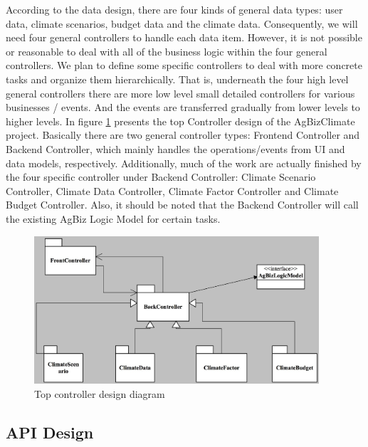 \documentclass[onecolumn, draftclsnofoot,10pt, compsoc]{article}
\begin{document}
		According to the data design, there are four kinds of general data types: user data, climate scenarios, budget data and the climate data. Consequently, we will need four general controllers to handle each data item. However, it is not possible or reasonable to deal with all of the business logic within the four general controllers. We plan to define some specific controllers to deal with more concrete tasks and organize them hierarchically. That is, underneath the four high level general controllers there are more low level small detailed controllers for various businesses / events. And the events are transferred gradually from lower levels to higher levels. In figure \ref{fig:TOPCon} presents the top Controller design of the AgBizClimate project. Basically there are two general controller types: Frontend Controller and Backend Controller, which mainly handles the operations/events from UI and data models, respectively. Additionally, much of the work are actually finished by the four specific controller under Backend Controller: Climate Scenario Controller, Climate Data Controller, Climate Factor Controller and Climate Budget Controller. Also, it should be noted that the Backend Controller will call the existing AgBiz Logic Model for certain tasks.\\

	\begin{figure}[htb]
		\begin{center}
			\includegraphics[width=300pt]{UMLDiagrams/TopController.eps}
		\end{center}
		\caption{Top controller design diagram}
		\label{fig:TOPCon}
	\end{figure}

	\subsection{API Design}
\end{document}
